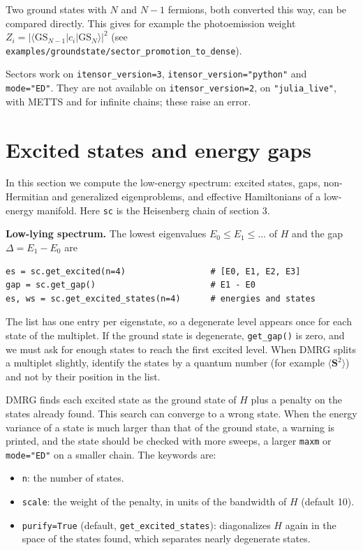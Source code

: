 \documentclass[11pt]{article}
\providecommand{\tightlist}{\setlength{\itemsep}{0pt}\setlength{\parskip}{0pt}}
\begin{document}
Two ground states with \(N\) and \(N-1\) fermions, both converted this way, can
be compared directly. This gives for example the photoemission weight
\(Z_i=|\langle\mathrm{GS}_{N-1}|c_i|\mathrm{GS}_N\rangle|^2\)
(see \texttt{examples/groundstate/sector\_\allowbreak{}promotion\_\allowbreak{}to\_\allowbreak{}dense}).

Sectors work on \texttt{itensor\_\allowbreak{}version=3}, \texttt{itensor\_\allowbreak{}version="python"} and
\texttt{mode="ED"}. They are not available on \texttt{itensor\_\allowbreak{}version=2}, on
\texttt{"julia\_\allowbreak{}live"}, with METTS and for infinite chains; these raise an error.

\section{Excited states and energy gaps}

In this section we compute the low-energy spectrum: excited states, gaps,
non-Hermitian and generalized eigenproblems, and effective Hamiltonians of
a low-energy manifold. Here \texttt{sc} is the Heisenberg chain of section 3.

\textbf{Low-lying spectrum.} The lowest eigenvalues \(E_0\le E_1\le\dots\) of \(H\)
and the gap \(\Delta=E_1-E_0\) are

\begin{lstlisting}
es = sc.get_excited(n=4)                 # [E0, E1, E2, E3]
gap = sc.get_gap()                       # E1 - E0
es, ws = sc.get_excited_states(n=4)      # energies and states
\end{lstlisting}

The list has one entry per eigenstate, so a degenerate level appears once
for each state of the multiplet. If the ground state is degenerate,
\texttt{get\_\allowbreak{}gap()} is zero, and we must ask for enough states to reach the first
excited level. When DMRG splits a multiplet slightly, identify the states
by a quantum number (for example \(\langle\mathbf S^2\rangle\)) and not by
their position in the list.

DMRG finds each excited state as the ground state of \(H\) plus a penalty
on the states already found. This search can converge to a wrong state.
When the energy variance of a state is much larger than that of the ground
state, a warning is printed, and the state should be checked with more
sweeps, a larger \texttt{maxm} or \texttt{mode="ED"} on a smaller chain. The keywords are:

\begin{itemize}
\tightlist
\item
  \texttt{n}: the number of states.
\item
  \texttt{scale}: the weight of the penalty, in units of the bandwidth of \(H\)
  (default 10).
\item
  \texttt{purify=True} (default, \texttt{get\_\allowbreak{}excited\_\allowbreak{}states}): diagonalizes \(H\) again in
  the space of the states found, which separates nearly degenerate states.
\end{itemize}
\end{document}
